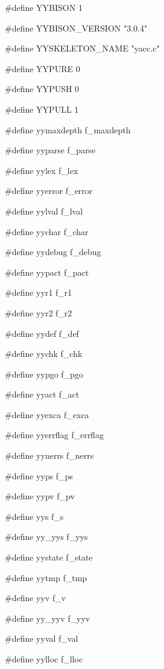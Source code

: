 {\stt \#define YYBISON 1}

\medskip
{\stt \#define YYBISON\_VERSION "3.0.4"}

\medskip
{\stt \#define YYSKELETON\_NAME "yacc.c"}

\medskip
{\stt \#define YYPURE 0}

\medskip
{\stt \#define YYPUSH 0}

\medskip
{\stt \#define YYPULL 1}

\medskip
{\stt \#define yymaxdepth f\_maxdepth}

\medskip
{\stt \#define yyparse f\_parse}

\medskip
{\stt \#define yylex f\_lex}

\medskip
{\stt \#define yyerror f\_error}

\medskip
{\stt \#define yylval f\_lval}

\medskip
{\stt \#define yychar f\_char}

\medskip
{\stt \#define yydebug f\_debug}

\medskip
{\stt \#define yypact f\_pact}

\medskip
{\stt \#define yyr1 f\_r1}

\medskip
{\stt \#define yyr2 f\_r2}

\medskip
{\stt \#define yydef f\_def}

\medskip
{\stt \#define yychk f\_chk}

\medskip
{\stt \#define yypgo f\_pgo}

\medskip
{\stt \#define yyact f\_act}

\medskip
{\stt \#define yyexca f\_exca}

\medskip
{\stt \#define yyerrflag f\_errflag}

\medskip
{\stt \#define yynerrs f\_nerrs}

\medskip
{\stt \#define yyps f\_ps}

\medskip
{\stt \#define yypv f\_pv}

\medskip
{\stt \#define yys f\_s}

\medskip
{\stt \#define yy\_yys f\_yys}

\medskip
{\stt \#define yystate f\_state}

\medskip
{\stt \#define yytmp f\_tmp}

\medskip
{\stt \#define yyv f\_v}

\medskip
{\stt \#define yy\_yyv f\_yyv}

\medskip
{\stt \#define yyval f\_val}

\medskip
{\stt \#define yylloc f\_lloc}


